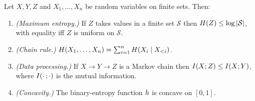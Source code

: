 \begin{fact}
\label{fac:entropy-facts}
Let $X, Y, Z$ and $X_1,\dots,X_n$ be random variables on finite sets. Then:
\begin{enumerate}[label=\textup{(\roman*)}, ref=\ref*{fac:entropy-facts}(\roman*)]
\item\label{fac:max-entropy}
  \emph{(Maximum entropy.)} If $Z$ takes values in a finite set $\mathcal S$
  then $H(Z) \le \log|\mathcal S|$, with equality iff $Z$ is uniform on
  $\mathcal S$.
\item\label{fac:chain-rule}
  \emph{(Chain rule.)} $H(X_1,\dots,X_n) = \sum_{i=1}^{n} H(X_i \mid X_{<i})$.
\item\label{fac:data-processing}
  \emph{(Data processing.)} If $X \to Y \to Z$ is a Markov chain then
  $I(X;Z) \le I(X;Y)$, where $I(\cdot\,;\cdot)$ is the mutual
  information.
\item\label{fac:concavity}
  \emph{(Concavity.)} The binary-entropy function $h$ is concave on $[0,1]$.
\end{enumerate}
\end{fact}
